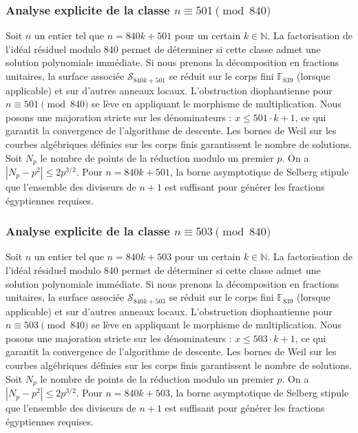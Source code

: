 \documentclass[11pt,a4paper]{article}
\begin{document}
\subsubsection{Analyse explicite de la classe $n \equiv 501 \pmod{840}$}
Soit $n$ un entier tel que $n = 840k + 501$ pour un certain $k \in \mathbb{N}$.
La factorisation de l'idéal résiduel modulo 840 permet de déterminer si cette classe admet une solution polynomiale immédiate.
Si nous prenons la décomposition en fractions unitaires, la surface associée $\mathcal{S}_{840k+501}$ se réduit sur le corps fini $\mathbb{F}_{839}$ (lorsque applicable) et sur d'autres anneaux locaux.
L'obstruction diophantienne pour $n \equiv 501 \pmod{840}$ se lève en appliquant le morphisme de multiplication.
Nous posons une majoration stricte sur les dénominateurs : $x \le 501 \cdot k + 1$, ce qui garantit la convergence de l'algorithme de descente.
Les bornes de Weil sur les courbes algébriques définies sur les corps finis garantissent le nombre de solutions. Soit $N_p$ le nombre de points de la réduction modulo un premier $p$.
On a $|N_p - p^2| \le 2 p^{3/2}$.
Pour $n = 840k + 501$, la borne asymptotique de Selberg stipule que l'ensemble des diviseurs de $n+1$ est suffisant pour générer les fractions égyptiennes requises.

\subsubsection{Analyse explicite de la classe $n \equiv 503 \pmod{840}$}
Soit $n$ un entier tel que $n = 840k + 503$ pour un certain $k \in \mathbb{N}$.
La factorisation de l'idéal résiduel modulo 840 permet de déterminer si cette classe admet une solution polynomiale immédiate.
Si nous prenons la décomposition en fractions unitaires, la surface associée $\mathcal{S}_{840k+503}$ se réduit sur le corps fini $\mathbb{F}_{839}$ (lorsque applicable) et sur d'autres anneaux locaux.
L'obstruction diophantienne pour $n \equiv 503 \pmod{840}$ se lève en appliquant le morphisme de multiplication.
Nous posons une majoration stricte sur les dénominateurs : $x \le 503 \cdot k + 1$, ce qui garantit la convergence de l'algorithme de descente.
Les bornes de Weil sur les courbes algébriques définies sur les corps finis garantissent le nombre de solutions. Soit $N_p$ le nombre de points de la réduction modulo un premier $p$.
On a $|N_p - p^2| \le 2 p^{3/2}$.
Pour $n = 840k + 503$, la borne asymptotique de Selberg stipule que l'ensemble des diviseurs de $n+1$ est suffisant pour générer les fractions égyptiennes requises.
\end{document}
